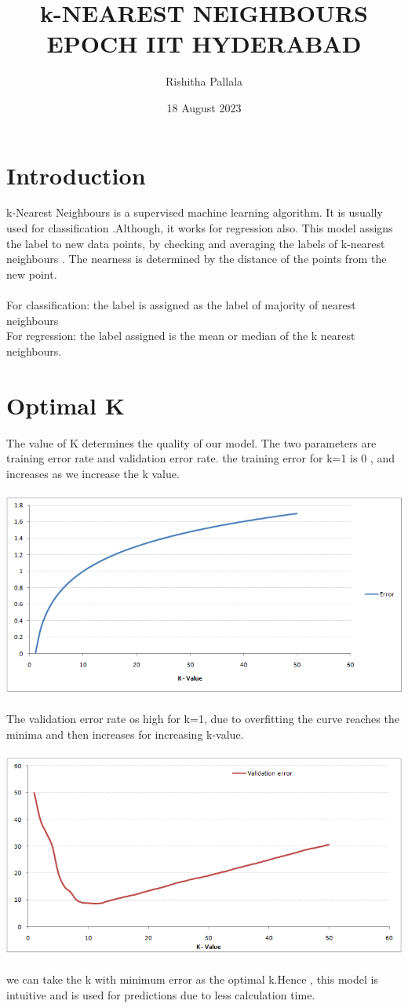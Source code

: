 \documentclass{article}
\title{\textbf{k-NEAREST NEIGHBOURS}\\EPOCH IIT HYDERABAD}
\author{Rishitha Pallala }
\date{18 August 2023}
\begin{document}
\maketitle
\section{Introduction}
 k-Nearest Neighbours is a supervised machine learning algorithm. It is usually used for classification .Although, it works for regression also. This model assigns the label to new data points, by checking and averaging the labels of k-nearest neighbours . The nearness is determined by the distance of the points from the new point.  \\\\
 For classification: the label is assigned as the label of majority of nearest neighbours\\
 For regression: the label assigned is the mean or median of the k nearest neighbours.
 \section{ Optimal K}
 The value of K determines the quality of our model. The two parameters are training error rate and validation error rate.
 the training error for k=1 is 0 , and increases as we increase the k value.\\\\
 \includegraphics[scale=0.4]{training-error.png}\\\\
 The validation error rate os high for k=1, due to overfitting the curve reaches the minima and then increases for increasing k-value.\\\\
 \includegraphics[scale=0.4]{validation-error_11.png}\\\\
 we can take the k with minimum error as the optimal k.Hence , this model is intuitive and is used for predictions due to less calculation time. 
\end{document}
